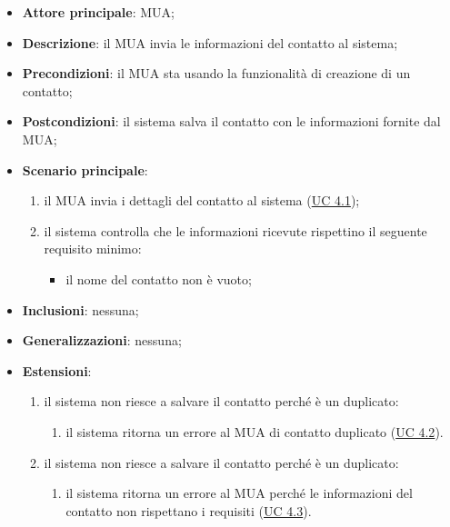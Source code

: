     \begin{itemize}
        \item \textbf{Attore principale}: MUA;
        \item \textbf{Descrizione}: il MUA invia le informazioni del contatto al sistema;
        \item \textbf{Precondizioni}: il MUA sta usando la funzionalità di creazione di un contatto;
        \item \textbf{Postcondizioni}: il sistema salva il contatto con le informazioni fornite dal MUA;
        \item \textbf{Scenario principale}:
            \begin{enumerate}
                \item il MUA invia i dettagli del contatto al sistema (\hyperref[sec:UC4.1]{UC 4.1});
                \item il sistema controlla che le informazioni ricevute rispettino il seguente requisito minimo:
                    \begin{itemize}
                        \item il nome del contatto non è vuoto;
                    \end{itemize}
            \end{enumerate}
        \item \textbf{Inclusioni}: nessuna;
        \item \textbf{Generalizzazioni}: nessuna;
        \item \textbf{Estensioni}:
            \begin{enumerate}[label=\alph*.]
                \item il sistema non riesce a salvare il contatto perché è un duplicato:
                \begin{enumerate}[label=\arabic*.]
                    \item il sistema ritorna un errore al MUA di contatto duplicato (\hyperref[sec:UC4.2]{UC 4.2}).
                \end{enumerate}
                \item il sistema non riesce a salvare il contatto perché è un duplicato:
                \begin{enumerate}[label=\arabic*.]
                    \item il sistema ritorna un errore al MUA perché le informazioni del contatto non rispettano i requisiti (\hyperref[sec:UC4.3]{UC 4.3}).
                \end{enumerate}
            \end{enumerate}
    \end{itemize}


